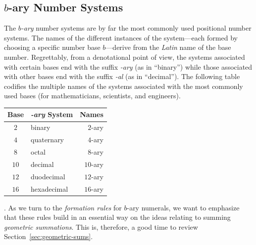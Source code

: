 \subsection{$b$-ary Number Systems}
\label{sec:b-ary-systems}

The {\it $b$-ary} number systems are by far the most commonly used positional number systems.  The names of the different instances of the system---each formed by choosing a specific number base $b$---derive from the {\em Latin} name of the base number.  Regrettably, from a denotational point of view, the systems associated with certain bases end with the suffix {\em -ary} (as in ``binary'') while those associated with other bases end with the suffix {\em -al}
(as in ``decimal'').  The following table codifies the multiple names of the systems associated with the most commonly used bases (for mathematicians, scientists, and engineers).

\medskip

\begin{tabular}{|c|lr|}
\hline
{\bf Base} & {\bf {\em -ary} System} & {\bf Names}  \\
\hline
$2$   & binary     & $2$-ary  \\
\hline 
$4$   & quaternary & $4$-ary  \\
\hline
$8$   & octal      & $8$-ary \\
\hline
$10$  & decimal    & $10$-ary  \\
\hline
$12$  & duodecimal & $12$-ary  \\
\hline
$16$  & hexadecimal & $16$-ary \\
\hline
\end{tabular}

\bigskip

.
As we turn to the {\it formation rules} for $b$-ary numerals, we want to emphasize that these rules build in an essential way on the ideas relating to summing {\em geometric summations}.  This is, therefore, a good time to review Section~\ref{sec:geometric-sums}.

\medskip


